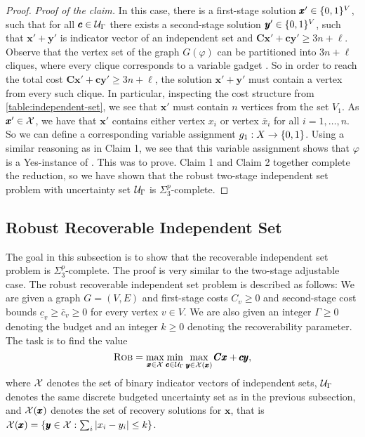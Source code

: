 \begin{proof}
\emph{Proof of the claim.} 
In this case, there is a first-stage solution $\pmb x' \in \{ 0,1 \}^V$, such that for all $\pmb c \in \mathcal{U}_\Gamma$ there exists a second-stage solution $\pmb y' \in \{ 0,1 \}^V$, 
such that $\pmb x'  + \pmb y'$ is indicator vector of an independent set and $\pmb C\pmb x' + \pmb c\pmb y' \geq 3n + \ell$. 
Observe that the vertex set of the graph $G(\varphi)$ can be partitioned into $3n + \ell$ cliques, where every clique corresponds to a variable gadget .
So in order to reach the total cost $\pmb C\pmb x' + \pmb c\pmb y' \geq 3n + \ell$, the solution $\pmb x' + \pmb y'$ must contain a vertex from every such clique. 
In particular, inspecting the cost structure from \cref{table:independent-set}, we see that $\pmb x'$ must contain $n$ vertices from the set $V_1$. 
As $\pmb x' \in \mathcal{X}$, we have that $\pmb x'$ contains either vertex $x_i$ or vertex $\overline{x}_i$ for all $i=1,\dots,n$. 
So we can define a corresponding variable assignment $g_1 : X \rightarrow \{ 0,1 \}$. 
Using a similar reasoning as in Claim 1, we see that this variable assignment shows that $\varphi$ is a Yes-instance of {\radj}. 
This was to prove. Claim 1 and Claim 2 together complete the reduction, so we have shown that the robust two-stage independent set problem with uncertainty set $\mathcal{U}_\Gamma$ is $\Sigma_3^p$-complete.
\end{proof}


\subsection{Robust Recoverable Independent Set}
\label{subsec:rec-ind-set}

The goal in this subsection is to show that the recoverable independent set problem is $\Sigma_3^p$-complete. 
The proof is very similar to the two-stage adjustable case. 
The robust recoverable independent set problem is described as follows: 
We are given a graph $G = (V,E)$ and first-stage costs $C_v \geq 0$ and second-stage cost bounds $\underline{c}_v \geq \overline{c}_v \geq 0$ for every vertex $v \in V$. 
We are also given an integer $\Gamma \geq 0$ denoting the budget and an integer $k \geq 0$ denoting the recoverability parameter. 
The task is to find the value 
\begin{equation}
 \textsc{Rob} = \max_{\pmb x  \in \mathcal{X}} \min_{\pmb c \in \mathcal{U}_\Gamma } \max_{\pmb y \in \mathcal{X}(\pmb x) } \pmb C \pmb x + \pmb c \pmb y, \label{eq:recoverable-ind-set}
 \end{equation}
where $\mathcal{X}$ denotes the set of binary indicator vectors of independent sets, $\mathcal{U}_\Gamma$ denotes the same discrete budgeted uncertainty set as in the previous subsection, and $\mathcal{X}(\pmb x)$ denotes the set of recovery solutions for $\pmb x$, that is $\mathcal{X}(\pmb x) = \{ \pmb y \in \mathcal{X} : \sum_i |x_i - y_i| \leq k \}$.


